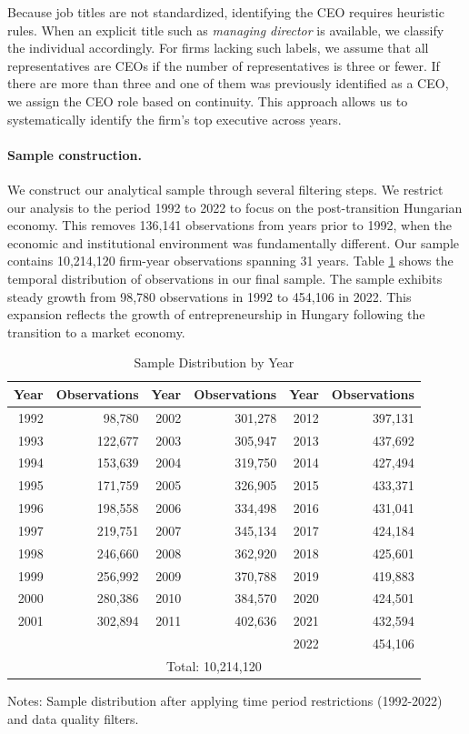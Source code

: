 \documentclass[11pt,a4paper]{article}
\begin{document}
Because job titles are not standardized, identifying the CEO requires heuristic rules. When an explicit title such as \emph{managing director} is available, we classify the individual accordingly. For firms lacking such labels, we assume that all representatives are CEOs if the number of representatives is three or fewer. If there are more than three and one of them was previously identified as a CEO, we assign the CEO role based on continuity. This approach allows us to systematically identify the firm's top executive across years.

\paragraph{Sample construction.} We construct our analytical sample through several filtering steps. We restrict our analysis to the period 1992 to 2022 to focus on the post-transition Hungarian economy. This removes 136,141 observations from years prior to 1992, when the economic and institutional environment was fundamentally different. Our sample contains 10,214,120 firm-year observations spanning 31 years. Table \ref{tab:sample} shows the temporal distribution of observations in our final sample. The sample exhibits steady growth from 98,780 observations in 1992 to 454,106 in 2022. This expansion reflects the growth of entrepreneurship in Hungary following the transition to a market economy.

\begin{table}[htbp]
\centering
\caption{Sample Distribution by Year}
\label{tab:sample}
\begin{tabular}{rr|rr|rr}
\toprule
Year & Observations & Year & Observations & Year & Observations \\
\midrule
1992 & 98,780 & 2002 & 301,278 & 2012 & 397,131 \\
1993 & 122,677 & 2003 & 305,947 & 2013 & 437,692 \\
1994 & 153,639 & 2004 & 319,750 & 2014 & 427,494 \\
1995 & 171,759 & 2005 & 326,905 & 2015 & 433,371 \\
1996 & 198,558 & 2006 & 334,498 & 2016 & 431,041 \\
1997 & 219,751 & 2007 & 345,134 & 2017 & 424,184 \\
1998 & 246,660 & 2008 & 362,920 & 2018 & 425,601 \\
1999 & 256,992 & 2009 & 370,788 & 2019 & 419,883 \\
2000 & 280,386 & 2010 & 384,570 & 2020 & 424,501 \\
2001 & 302,894 & 2011 & 402,636 & 2021 & 432,594 \\
 &  &  &  & 2022 & 454,106 \\
\midrule
\multicolumn{6}{c}{Total: 10,214,120} \\
\bottomrule
\end{tabular}
\footnotesize
Notes: Sample distribution after applying time period restrictions (1992-2022) and data quality filters.
\end{table}
\end{document}
